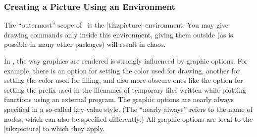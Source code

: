 \subsubsection{Creating a Picture Using an Environment}

The ``outermost'' scope of \tikzname\ is the |{tikzpicture}| 
environment. You may give drawing commands only inside this
environment, giving them outside (as is possible in many other
packages) will result in chaos.

In \tikzname, the way graphics are rendered is strongly influenced by
graphic options. For example, there is an option for setting the color used
for drawing, another for setting the color used for filling, and also
more obscure ones like the option  for setting the prefix used in the
filenames of temporary files written while plotting functions using an
external program. The graphic options are nearly always specified in a
so-called key-value style. (The ``nearly always'' refers to the name
of nodes, which can also be specified differently.) All graphic
options are local to the |{tikzpicture}| to which they apply.

